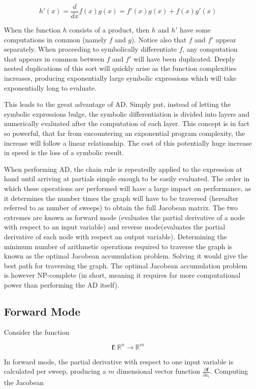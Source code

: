 \documentclass[11pt]{article}
\begin{document}
\[ h'(x) = \frac d{dx} f(x)g(x) = f'(x)g(x) + f(x)g'(x) \]

When the function $ h $ consists of a product, then $ h $ and $ h' $ have some computations in common (namely $ f $ and $ g $). Notice also that $ f $ and $ f' $ appear separately. When proceeding to symbolically differentiate  $ f $, any computation that appears in common between $ f $ and $ f' $ will have been duplicated. Deeply nested duplications of this sort will quickly arise as the function complexities increases, producing exponentially large symbolic expressions which will take exponentially long to evaluate. 

This leads to the great advantage of AD. Simply put, instead of letting the symbolic expressions bulge, the symbolic differentiation is divided into layers and numerically evaluated after the computation of each layer. This concept is in fact so powerful, that far from encountering an exponential program complexity, the increase will follow a linear relationship. The cost of this potentially huge increase in speed is the loss of a symbolic result. 

When performing AD, the chain rule is repeatedly applied to the expression at hand until arriving at partials simple enough to be easily evaluated. The order in which these operations are performed will have a large impact on performance, as it determines the number times the graph will have to be traversed (hereafter referred to as number of sweeps) to obtain the full Jacobean matrix. The two extremes are known as forward mode (evaluates the partial derivative of a node with respect to an input variable) and reverse mode(evaluates the partial derivative of each node with respect an output variable). Determining the minimum number of arithmetic operations required to traverse the graph is known as the optimal Jacobean accumulation problem. Solving it would give the best path for traversing the graph. The optimal Jacobean accumulation problem is however NP-complete (in short, meaning it requires far more computational power than performing the AD itself).
\subsection{Forward Mode}

Consider the function 

$$ \mathbf {f} : \mathbb{R}^n \rightarrow \mathbb{R}^m $$ 

In forward mode, the partial derivative with respect to one input variable is calculated per sweep, producing a $ m $ dimensional vector function $ \frac{\partial \mathbf {f}}{\partial x_i} $. Computing the Jacobean  
\end{document}
